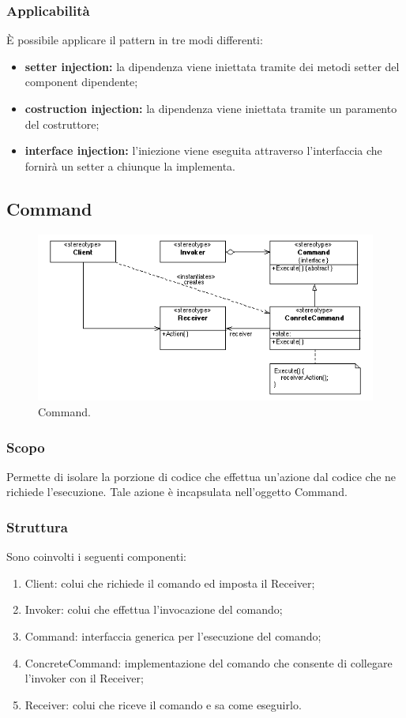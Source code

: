 \subsubsection{Applicabilità} È possibile applicare il pattern in tre modi differenti:
\begin{itemize}
	\item \textbf{setter injection:} la dipendenza viene iniettata tramite dei metodi setter del component dipendente;
	\item \textbf{costruction injection:} la dipendenza viene iniettata tramite un paramento del costruttore;
	\item \textbf{interface injection:} l'iniezione viene eseguita attraverso l'interfaccia che fornirà un setter a chiunque la implementa.
\end{itemize}

\subsection{Command}

\begin{figure}[H] \label{fig:command}
	\includegraphics[scale=0.6]{img/command.png}
	\caption{Command.}
\end{figure}

\subsubsection{Scopo} Permette di isolare la porzione di codice che effettua un'azione dal codice che ne richiede l'esecuzione. Tale azione è incapsulata nell'oggetto Command.

\subsubsection{Struttura} Sono coinvolti i seguenti componenti:
\begin{enumerate}
	\item Client: colui che richiede il comando  ed imposta il Receiver;
	\item Invoker: colui che effettua l'invocazione del comando;
	\item Command: interfaccia generica per l'esecuzione del comando;
	\item ConcreteCommand: implementazione del comando che consente di collegare l'invoker con il Receiver;
	\item Receiver: colui che riceve il comando e sa come eseguirlo.
\end{enumerate}

